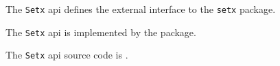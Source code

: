 
The {\tt Setx} api defines the external interface to the {\tt setx} package.

The {\tt Setx} api is implemented by the  package.

The {\tt Setx} api source code is .
